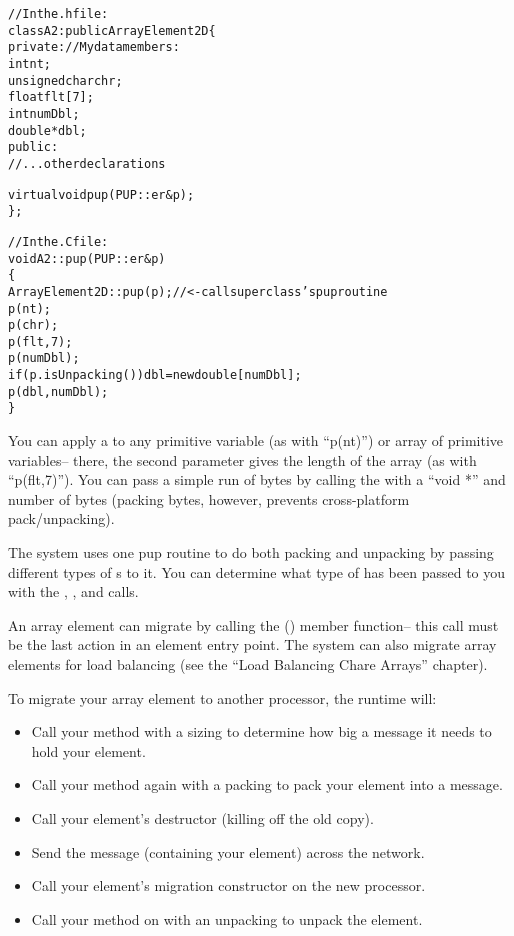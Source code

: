 \begin{alltt}
//In the .h file:
class A2:public ArrayElement2D \{
private: //My data members:
    int nt;
    unsigned char chr;
    float flt[7];
    int numDbl;
    double *dbl;
public:	
    //...other declarations

    virtual void pup(PUP::er \&p);
\};

//In the .C file:
void A2::pup(PUP::er \&p)
\{
    ArrayElement2D::pup(p); //<- call superclass's pup routine
    p(nt);
    p(chr);
    p(flt,7);
    p(numDbl);
    if (p.isUnpacking()) dbl=new double[numDbl];
    p(dbl,numDbl);
\}
\end{alltt}

You can apply a  to any primitive variable
(as with ``p(nt)'') or array of primitive variables-- there,
the second parameter gives the length of the array (as with
``p(flt,7)'').  You can pass a simple run of bytes 
by calling the  with a ``void *'' and number of bytes
(packing bytes, however, prevents cross-platform pack/unpacking).

The system uses one pup routine to do both packing and unpacking by
passing different types of s to it.  You can determine
what type of  has been passed to you with the
, , and  calls.

An array element can migrate by calling the () member function-- this call must be the last action
in an element entry point.  The system can also migrate array elements
for load balancing (see the ``Load Balancing Chare Arrays'' chapter).

To migrate your array element to another processor, the \charmpp{}
runtime will:

\begin{itemize}
\item Call your  method with a sizing  to determine how 
big a message it needs to hold your element.
\item Call your  method again with a packing  to pack 
your element into a message.
\item Call your element's destructor (killing off the old copy).
\item Send the message (containing your element) across the network.
\item Call your element's migration constructor on the new processor.
\item Call your  method on with an unpacking  to unpack 
the element.
\end{itemize}

